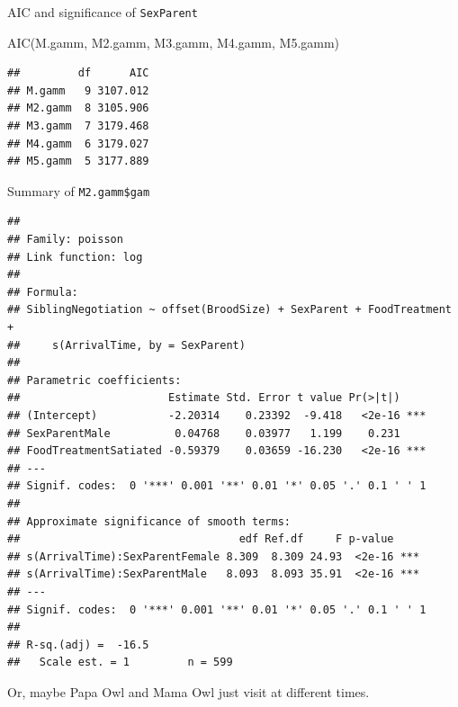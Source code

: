 \documentclass[
  ignorenonframetext,
]{beamer}
\newenvironment{Shaded}{\begin{snugshade}}{\end{snugshade}}
\newcommand{\FunctionTok}[1]{\textcolor[rgb]{0.00,0.00,0.00}{#1}}
\newcommand{\NormalTok}[1]{#1}
\begin{document}
\begin{frame}[fragile]{AIC and significance of \texttt{SexParent}}
\scriptsize

\begin{Shaded}
\begin{Highlighting}[]
\FunctionTok{AIC}\NormalTok{(M.gamm, M2.gamm, M3.gamm, M4.gamm, M5.gamm)}
\end{Highlighting}
\end{Shaded}

\begin{verbatim}
##         df      AIC
## M.gamm   9 3107.012
## M2.gamm  8 3105.906
## M3.gamm  7 3179.468
## M4.gamm  6 3179.027
## M5.gamm  5 3177.889
\end{verbatim}
\end{frame}

\begin{frame}[fragile]{Summary of \texttt{M2.gamm\$gam}}
\protect\hypertarget{summary-of-m2.gammgam}{}
\tiny

\begin{verbatim}
## 
## Family: poisson 
## Link function: log 
## 
## Formula:
## SiblingNegotiation ~ offset(BroodSize) + SexParent + FoodTreatment + 
##     s(ArrivalTime, by = SexParent)
## 
## Parametric coefficients:
##                       Estimate Std. Error t value Pr(>|t|)    
## (Intercept)           -2.20314    0.23392  -9.418   <2e-16 ***
## SexParentMale          0.04768    0.03977   1.199    0.231    
## FoodTreatmentSatiated -0.59379    0.03659 -16.230   <2e-16 ***
## ---
## Signif. codes:  0 '***' 0.001 '**' 0.01 '*' 0.05 '.' 0.1 ' ' 1
## 
## Approximate significance of smooth terms:
##                                  edf Ref.df     F p-value    
## s(ArrivalTime):SexParentFemale 8.309  8.309 24.93  <2e-16 ***
## s(ArrivalTime):SexParentMale   8.093  8.093 35.91  <2e-16 ***
## ---
## Signif. codes:  0 '***' 0.001 '**' 0.01 '*' 0.05 '.' 0.1 ' ' 1
## 
## R-sq.(adj) =  -16.5   
##   Scale est. = 1         n = 599
\end{verbatim}

Or, maybe Papa Owl and Mama Owl just visit at different times.
\end{frame}
\end{document}
